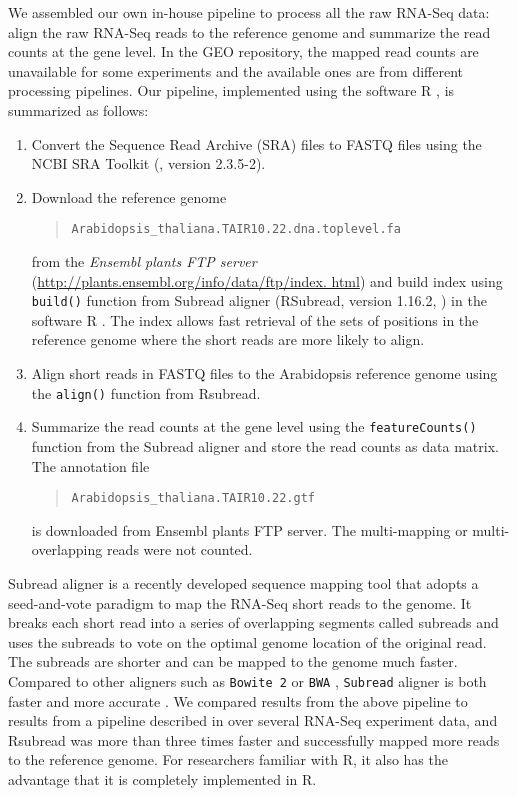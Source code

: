 We assembled our own in-house pipeline to process all the raw RNA-Seq data:
align the raw RNA-Seq reads to the reference genome and summarize the read counts at the 
gene level. In the GEO repository, the
mapped read counts are unavailable for some experiments and the available ones
are from different processing pipelines.  
Our pipeline, implemented using the software R \citep{Rpackage}, is summarized as follows: 
\begin{enumerate}
	\item Convert the Sequence Read Archive (SRA) files to FASTQ files using the NCBI SRA Toolkit 
	(\cite{leinonen2010sequence}, version 2.3.5-2).
	\item Download the reference genome 
	\begin{quote}
		\verb|Arabidopsis_thaliana.TAIR10.22.dna.toplevel.fa |
	\end{quote} 
	from the \textit{ Ensembl plants FTP server} 
	(\url{http://plants.ensembl.org/info/data/ftp/index. html}) and build index using 
	\verb|build()| function from 
	Subread aligner (RSubread, version 1.16.2, \citealt{liao2013subread}) in the software R
	\citep{ Rpackage}. The index allows fast retrieval of the sets of positions in the reference 
	genome where the short reads are more likely to align. 
	\item Align short reads in FASTQ files to the Arabidopsis reference genome using the 
	\verb|align()| function from Rsubread. 
	\item
	Summarize the read counts at the gene level using the \verb|featureCounts()| function from the
	Subread aligner
	and store the read counts as data matrix.  
	The annotation file 
	\begin{quote}
		\verb"Arabidopsis_thaliana.TAIR10.22.gtf" 
	\end{quote}
	is downloaded from Ensembl plants FTP server. The multi-mapping or
	multi-overlapping reads were not counted.  
	
\end{enumerate}
Subread aligner is a recently developed sequence mapping tool that adopts a
seed-and-vote paradigm to map the RNA-Seq short reads to the genome. 
It breaks each short read into a series of overlapping segments called
subreads and uses the subreads to vote on the optimal genome location of the
original read. The subreads are shorter and can be mapped to the genome much
faster.
Compared to other aligners such as \verb|Bowite 2| \citep{langmead2012fast} or \verb|BWA|
\citep{li2009fast}, \verb|Subread| aligner is both faster and more accurate
\citep{liao2013subread}. We compared results from the above
pipeline to results from a pipeline described in \citet{anders2013count} over several RNA-Seq 
experiment data, and Rsubread
was more than three times faster and successfully mapped more reads to the
reference genome.  For researchers familiar with R, it also has the advantage
that it is completely implemented in R.

